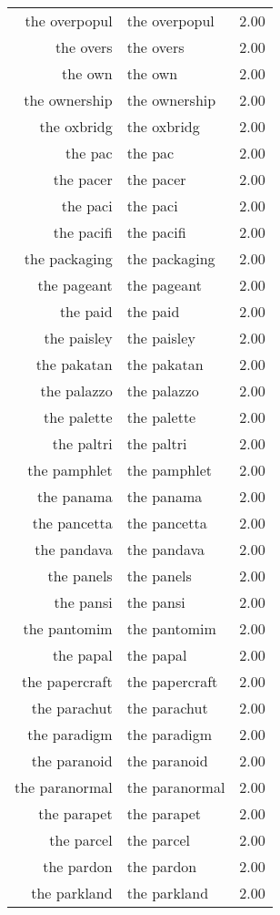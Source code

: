 \begin{table}[ht]
\begin{tabular}{rlr}
  the overpopul & the overpopul & 2.00 \\ 
  the overs & the overs & 2.00 \\ 
  the own & the own & 2.00 \\ 
  the ownership & the ownership & 2.00 \\ 
  the oxbridg & the oxbridg & 2.00 \\ 
  the pac & the pac & 2.00 \\ 
  the pacer & the pacer & 2.00 \\ 
  the paci & the paci & 2.00 \\ 
  the pacifi & the pacifi & 2.00 \\ 
  the packaging & the packaging & 2.00 \\ 
  the pageant & the pageant & 2.00 \\ 
  the paid & the paid & 2.00 \\ 
  the paisley & the paisley & 2.00 \\ 
  the pakatan & the pakatan & 2.00 \\ 
  the palazzo & the palazzo & 2.00 \\ 
  the palette & the palette & 2.00 \\ 
  the paltri & the paltri & 2.00 \\ 
  the pamphlet & the pamphlet & 2.00 \\ 
  the panama & the panama & 2.00 \\ 
  the pancetta & the pancetta & 2.00 \\ 
  the pandava & the pandava & 2.00 \\ 
  the panels & the panels & 2.00 \\ 
  the pansi & the pansi & 2.00 \\ 
  the pantomim & the pantomim & 2.00 \\ 
  the papal & the papal & 2.00 \\ 
  the papercraft & the papercraft & 2.00 \\ 
  the parachut & the parachut & 2.00 \\ 
  the paradigm & the paradigm & 2.00 \\ 
  the paranoid & the paranoid & 2.00 \\ 
  the paranormal & the paranormal & 2.00 \\ 
  the parapet & the parapet & 2.00 \\ 
  the parcel & the parcel & 2.00 \\ 
  the pardon & the pardon & 2.00 \\ 
  the parkland & the parkland & 2.00 \\ 

\end{tabular}
\end{table}
